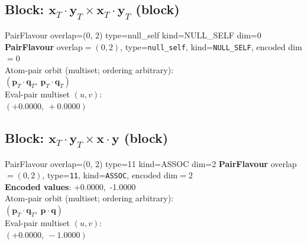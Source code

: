 \documentclass[a4paper,11pt]{article}
\newcommand{\pdcegfomjfhook}[2]{\mathbf{#1} \cdot \mathbf{#2}}
\newcommand{\fpbeomcfokjooi}[2]{\mathbf{#1}_T \cdot \mathbf{#2}_T}
\begin{document}
\subsection{Block: $\fpbeomcfokjooi{x}{y} \times \fpbeomcfokjooi{x}{y}$  (block)}
    PairFlavour  overlap=(0, 2)  type=null\_self  kind=NULL\_SELF  dim=0
\textbf{PairFlavour} overlap$=(0, 2)$, type=\texttt{null\_self}, kind=\texttt{NULL\_SELF}, encoded dim$=0$\\
\quad Atom-pair orbit (multiset; ordering arbitrary):\\
$(\fpbeomcfokjooi{p}{q},\ \fpbeomcfokjooi{p}{q})$\\
\quad Eval-pair multiset $(u, v)$:\\
$(+0.0000,\ +0.0000)$\\

\subsection{Block: $\fpbeomcfokjooi{x}{y} \times \pdcegfomjfhook{x}{y}$  (block)}
    PairFlavour  overlap=(0, 2)  type=11  kind=ASSOC  dim=2
\textbf{PairFlavour} overlap$=(0, 2)$, type=\texttt{11}, kind=\texttt{ASSOC}, encoded dim$=2$\\
\textbf{      Encoded values}: +0.0000,\ -1.0000\\
\quad Atom-pair orbit (multiset; ordering arbitrary):\\
$(\fpbeomcfokjooi{p}{q},\ \pdcegfomjfhook{p}{q})$\\
\quad Eval-pair multiset $(u, v)$:\\
$(+0.0000,\ -1.0000)$\\
\end{document}
